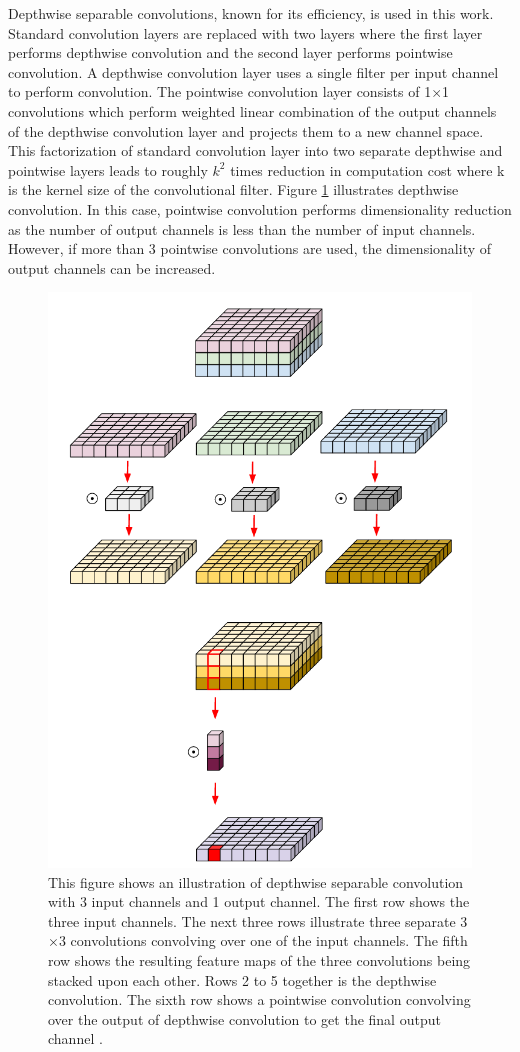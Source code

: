 Depthwise separable convolutions, known for its efficiency, is used in this work. Standard convolution layers are replaced with two layers where the first layer performs depthwise convolution and the second layer performs pointwise convolution. A depthwise convolution layer uses a single filter per input channel to perform convolution. The pointwise convolution layer consists of 1$\times$1 convolutions which perform weighted linear combination of the output channels of the depthwise convolution layer and projects them to a new channel space. This factorization of standard convolution layer into two separate depthwise and pointwise layers leads to roughly $k^2$ times reduction in computation cost where k is the kernel size of the convolutional filter. Figure \ref{Fig:depthwise} illustrates depthwise convolution. In this case, pointwise convolution performs dimensionality reduction as the number of output channels is less than the number of input channels. However, if more than 3 pointwise convolutions are used, the dimensionality of output channels can be increased.

	\begin{figure}
		\centering
		\includegraphics[width=.5\linewidth]{images/depthwise}
		\caption{This figure shows an illustration of depthwise separable convolution with 3 input channels and 1 output channel. The first row shows the three input channels. The next three rows illustrate three separate 3$\times$3 convolutions convolving over one of the input channels. The fifth row shows the resulting feature maps of the three convolutions being stacked upon each other. Rows 2 to 5 together is the depthwise convolution. The sixth row shows a pointwise convolution convolving over the output of depthwise convolution to get the final output channel \cite{depthwise}.}
		\label{Fig:depthwise}
	\end{figure}

